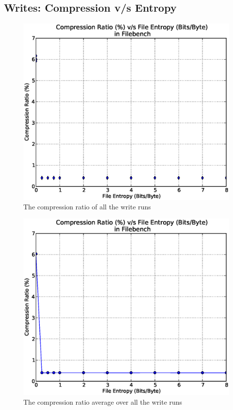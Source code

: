 \subsection{Writes: Compression v/s Entropy}
\begin{figure}[H]
\begin{center}
\includegraphics[scale=.55]{../results/set2/write_comp_2.eps}
\caption{The compression ratio of all the write runs}
\label{fig:comp2}
\end{center}
\end{figure}


\begin{figure}[H]
\begin{center}
\includegraphics[scale=.55]{../results/set2/write_comp_avg_2.eps}
\caption{The compression ratio average over all the write runs}
\label{fig:compavg2}
\end{center}
\end{figure}

